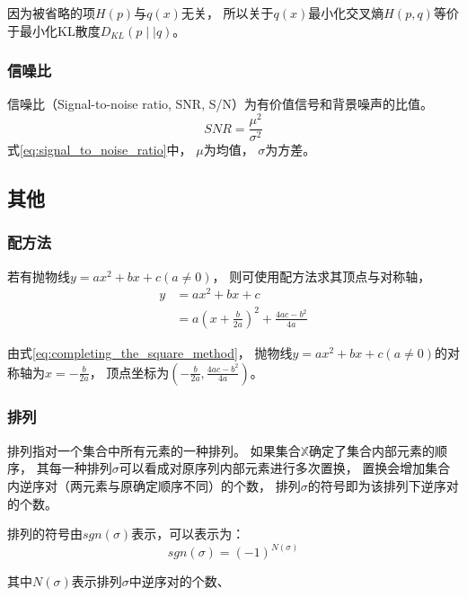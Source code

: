 因为被省略的项{$H(p)$}与{$q(x)$}无关，
所以关于{$q(x)$}最小化交叉熵{$H(p,q)$}等价于最小化KL散度{$D_{KL}(p \mid \mid q)$}。



\subsubsection{信噪比}
信噪比（Signal-to-noise ratio, SNR, S/N）为有价值信号和背景噪声的比值。
\begin{equation}
    \label{eq:signal_to_noise_ratio}
    SNR=\frac{\mu^{2}}{\sigma^{2}}
\end{equation}
式{\ref{eq:signal_to_noise_ratio}}中，
{$\mu$}为均值，
{$\sigma$}为方差。



\subsection{其他}
\subsubsection{配方法}
若有抛物线{$y=ax^{2}+bx+c(a \neq 0)$}，
则可使用配方法求其顶点与对称轴，
\begin{align}
    y&=ax^{2}+bx+c\\
     &= a{(x+\frac{b}{2a})}^{2} + \frac{4ac-b^2}{4a} \label{eq:completing_the_square_method}
\end{align}

由式{\ref{eq:completing_the_square_method}}，
抛物线{$y=ax^{2}+bx+c(a \neq 0)$}的对称轴为{$x=-\frac{b}{2a}$}，
顶点坐标为{$(-\frac{b}{2a},\frac{4ac-b^2}{4a})$}。


\subsubsection{排列}

排列指对一个集合中所有元素的一种排列。
如果集合{$\mathbb{X} $}确定了集合内部元素的顺序，
其每一种排列{$\sigma$}可以看成对原序列内部元素进行多次置换，
置换会增加集合内逆序对（两元素与原确定顺序不同）的个数，
排列{$\sigma$}的符号即为该排列下逆序对的个数。

排列的符号由{$sgn(\sigma)$}表示，可以表示为：
\begin{equation}
    \label{eq:parity_of_a_permutation}
    sgn(\sigma)={(-1)}^{N(\sigma)}
\end{equation}

其中{$N(\sigma)$}表示排列{$\sigma$}中逆序对的个数、

